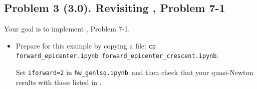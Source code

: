 \documentclass[11pt,titlepage,fleqn]{article}
\newcommand{\tfile}{{\tt hw\_genlsq.ipynb}}
\newcommand{\tfileFE}{{\tt forward\_epicenter.ipynb}}
\newcommand{\tfileFEC}{{\tt forward\_epicenter\_crescent.ipynb}}
\begin{document}

\subsection*{Problem 3 (3.0). Revisiting \citet{Tarantola2005}, Problem 7-1}

Your goal is to implement \citet{Tarantola2005}, Problem 7-1.
%
\begin{itemize}
\item Prepare for this example by copying a file: \verb+cp+ \tfileFE\ \tfileFEC.

Set \verb+iforward=2+ in \tfile\ and then check that your quasi-Newton results with those listed in .


\end{itemize}

\end{document}
